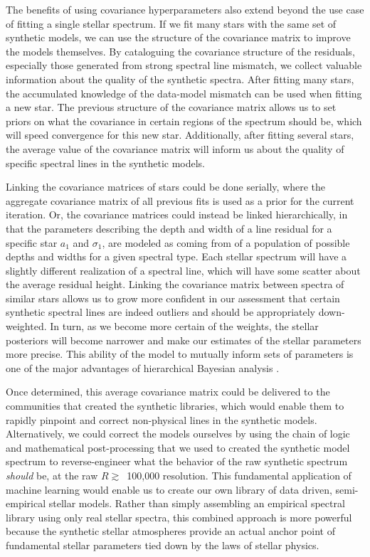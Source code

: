 \documentclass[iop,floatfix]{emulateapj}
\begin{document}
The benefits of using covariance hyperparameters also extend beyond the use case of fitting a single stellar spectrum. If we fit many stars with the same set of synthetic models, we can use the structure of the covariance matrix to improve the models themselves. By cataloguing the covariance structure of the residuals, especially those generated from strong spectral line mismatch, we collect valuable information about the quality of the synthetic spectra. After fitting many stars, the accumulated knowledge of the data-model mismatch can be used when fitting a new star. The previous structure of the covariance matrix allows us to set priors on what the covariance in certain regions of the spectrum should be, which will speed convergence for this new star. Additionally, after fitting several stars, the average value of the covariance matrix will inform us about the quality of specific spectral lines in the synthetic models. 

Linking the covariance matrices of stars could be done serially, where the aggregate covariance matrix of all previous fits is used as a prior for the current iteration. Or, the covariance matrices could instead be linked hierarchically, in that the parameters describing the depth and width of a line residual for a specific star $a_1$ and $\sigma_1$, are modeled as coming from of a population of possible depths and widths for a given spectral type. Each stellar spectrum will have a slightly different realization of a spectral line, which will have some scatter about the average residual height. Linking the covariance matrix between spectra of similar stars allows us to grow more confident in our assessment that certain synthetic spectral lines are indeed outliers and should be appropriately down-weighted. In turn, as we become more certain of the weights, the stellar posteriors will become narrower and make our estimates of the stellar parameters more precise. This ability of the model to mutually inform sets of parameters is one of the major advantages of hierarchical Bayesian analysis \citep{kruschke10}.

Once determined, this average covariance matrix could be delivered to the communities that created the synthetic libraries, which would enable them to rapidly pinpoint and correct non-physical lines in the synthetic models. Alternatively, we could correct the models ourselves by using the chain of logic and mathematical post-processing that we used to created the synthetic model spectrum to reverse-engineer what the behavior of the raw synthetic spectrum \emph{should} be, at the raw $R \gtrsim$~100,000 resolution. This fundamental application of machine learning would enable us to create our own library of data driven, semi-empirical stellar models. Rather than simply assembling an empirical spectral library using only real stellar spectra, this combined approach is more powerful because the synthetic stellar atmospheres provide an actual anchor point of fundamental stellar parameters tied down by the laws of stellar physics.
\end{document}
